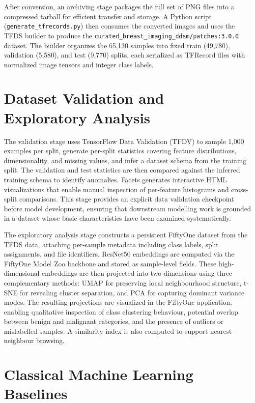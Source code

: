 \documentclass[justified,notoc,openany]{tufte-book}
\begin{document}
After conversion, an archiving stage packages the full set of PNG files into a compressed tarball for efficient transfer and storage. A Python script (\texttt{generate\_tfrecords.py}) then consumes the converted images and uses the TFDS builder to produce the \texttt{curated\_breast\_imaging\_ddsm/patches:3.0.0} dataset. The builder organizes the 65,130 samples into fixed train (49,780), validation (5,580), and test (9,770) splits, each serialized as TFRecord files with normalized image tensors and integer class labels.

\section{Dataset Validation and Exploratory Analysis}\label{dataset-validation-and-exploratory-analysis}

The validation stage uses TensorFlow Data Validation (TFDV) to sample 1,000 examples per split, generate per-split statistics covering feature distributions, dimensionality, and missing values, and infer a dataset schema from the training split. The validation and test statistics are then compared against the inferred training schema to identify anomalies. Facets generates interactive HTML visualizations that enable manual inspection of per-feature histograms and cross-split comparisons. This stage provides an explicit data validation checkpoint before model development, ensuring that downstream modelling work is grounded in a dataset whose basic characteristics have been examined systematically.

The exploratory analysis stage constructs a persistent FiftyOne dataset from the TFDS data, attaching per-sample metadata including class labels, split assignments, and file identifiers. ResNet50 embeddings are computed via the FiftyOne Model Zoo backbone and stored as sample-level fields. These high-dimensional embeddings are then projected into two dimensions using three complementary methods: UMAP for preserving local neighbourhood structure, t-SNE for revealing cluster separation, and PCA for capturing dominant variance modes. The resulting projections are visualized in the FiftyOne application, enabling qualitative inspection of class clustering behaviour, potential overlap between benign and malignant categories, and the presence of outliers or mislabelled samples. A similarity index is also computed to support nearest-neighbour browsing.

\section{Classical Machine Learning Baselines}\label{classical-machine-learning-baselines}
\end{document}

